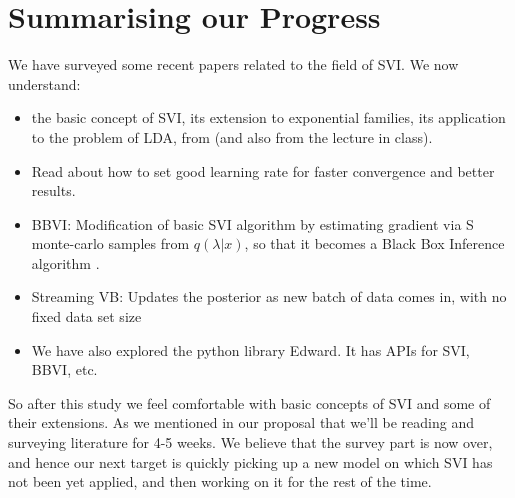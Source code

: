 \documentclass{article} %
\begin{document}
        
\section{Summarising our Progress}
    We have surveyed some recent papers related to the field of SVI. We now understand:
    \begin{itemize}
        \item the basic concept of SVI, its extension to exponential families, its application to the problem of LDA, from \cite{svi} (and also from the lecture in class).
        \item Read about how to set good learning rate \cite{ranganath2013adaptive} for faster convergence and better results.
        \item BBVI: Modification of basic SVI algorithm by estimating gradient via S monte-carlo samples from $q(\lambda|x)$, so that it becomes a Black Box Inference algorithm\cite{blackboxVI} .
        \item Streaming VB: Updates the posterior as new batch of data comes in, with no fixed data set size
        \item We have also explored the python library Edward. It has APIs for SVI, BBVI, etc. 
        
    \end{itemize}    
    So after this study we feel comfortable with basic concepts of SVI and some of their extensions. As we mentioned in our proposal that we'll be reading and surveying literature for 4-5 weeks. We believe that the survey part is now over, and hence our next target is quickly picking up a new model on which SVI has not been yet applied, and then working on it for the rest of the time.  



\end{document}
